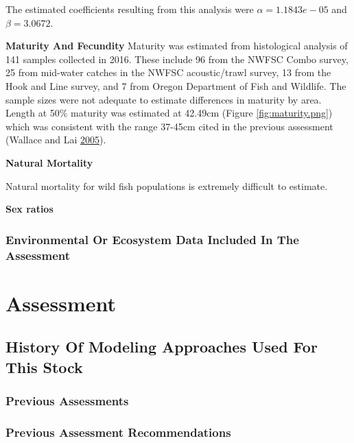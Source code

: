 \documentclass[12pt,]{article}
\begin{document}
The estimated coefficients resulting from this analysis were
\(\alpha = 1.1843e-05\) and \(\beta = 3.0672\).

\vspace{.5cm}

\textbf{Maturity And Fecundity} Maturity was estimated from histological
analysis of 141 samples collected in 2016. These include 96 from the
NWFSC Combo survey, 25 from mid-water catches in the NWFSC
acoustic/trawl survey, 13 from the Hook and Line survey, and 7 from
Oregon Department of Fish and Wildlife. The sample sizes were not
adequate to estimate differences in maturity by area. Length at 50\%
maturity was estimated at 42.49cm (Figure \ref{fig:maturity.png}) which
was consistent with the range 37-45cm cited in the previous assessment
(Wallace and Lai \protect\hyperlink{ref-Wallace2005}{2005}).

\vspace{.5cm}

\textbf{Natural Mortality}

Natural mortality for wild fish populations is extremely difficult to
estimate.

\vspace{.5cm}

\textbf{Sex ratios}

\subsubsection{Environmental Or Ecosystem Data Included In The
Assessment}\label{environmental-or-ecosystem-data-included-in-the-assessment}

\section{Assessment}\label{assessment}

\subsection{History Of Modeling Approaches Used For This
Stock}\label{history-of-modeling-approaches-used-for-this-stock}

\subsubsection{Previous Assessments}\label{previous-assessments}

\subsubsection{Previous Assessment
Recommendations}\label{previous-assessment-recommendations}
\end{document}
